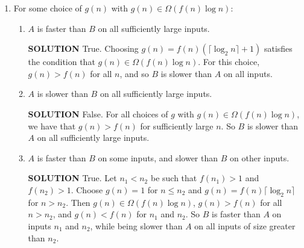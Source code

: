 \documentclass[11pt]{article}
\begin{document}
\begin{enumerate}
\item For some choice of $g(n)$ with $g(n) \in \Omega(f(n) \log n)$:
\begin{enumerate}
\item $A$ is faster than $B$ on all sufficiently large inputs.

\textbf{SOLUTION}
True. Choosing $g(n) = f(n) (\lceil \log_2 n \rceil + 1)$ satisfies the condition that
$g(n) \in \Omega(f(n) \log n)$.  For this choice, $g(n) > f(n)$
for all $n$, and so $B$ is slower than $A$ on all inputs.

\item $A$ is slower than $B$ on all sufficiently large inputs.

\textbf{SOLUTION}
False. For all choices of $g$ with $g(n) \in
     \Omega(f(n) \log n)$, we have that $g(n) > f(n)$ for sufficiently large $n$. 
So $B$ is slower than $A$ on all sufficiently large inputs.

\item $A$ is faster than $B$ on some inputs, and slower than $B$ on other inputs.

\textbf{SOLUTION} True. Let $n_1 < n_2$ be such that $f(n_1) > 1$ and $f(n_2) > 1$.
Choose $g(n) = 1$ for $n \le n_2$ and $g(n) = f(n) \lceil \log_2 n \rceil$ for $n > n_2$.
Then $g(n) \in \Omega(f(n) \log n)$, $g(n) > f(n)$
for all $n > n_2$, and $g(n) < f(n)$ for $n_1$ and $n_2$.
So $B$ is faster than $A$ on inputs $n_1$ and $n_2$, while being slower
than $A$ on all inputs of size greater than $n_2$.
\end{enumerate}


\end{enumerate}
\end{document}
